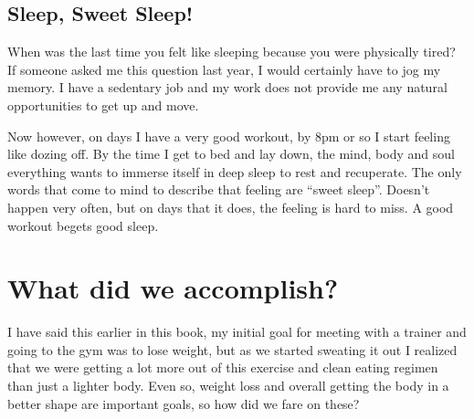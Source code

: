 \documentclass[
  oneside]{book}
\begin{document}
\hypertarget{sleep-sweet-sleep}{%
\section{Sleep, Sweet Sleep!}\label{sleep-sweet-sleep}}

When was the last time you felt like sleeping because you were physically tired? If someone asked me this question last year, I would certainly have to jog my memory. I have a sedentary job and my work does not provide me any natural opportunities to get up and move.

Now however, on days I have a very good workout, by 8pm or so I start feeling like dozing off. By the time I get to bed and lay down, the mind, body and soul everything wants to immerse itself in deep sleep to rest and recuperate. The only words that come to mind to describe that feeling are ``sweet sleep''. Doesn't happen very often, but on days that it does, the feeling is hard to miss. A good workout begets good sleep.

\hypertarget{what-did-we-accomplish}{%
\chapter{What did we accomplish?}\label{what-did-we-accomplish}}

I have said this earlier in this book, my initial goal for meeting with a trainer and going to the gym was to lose weight, but as we started sweating it out I realized that we were getting a lot more out of this exercise and clean eating regimen than just a lighter body. Even so, weight loss and overall getting the body in a better shape are important goals, so how did we fare on these?
\end{document}
